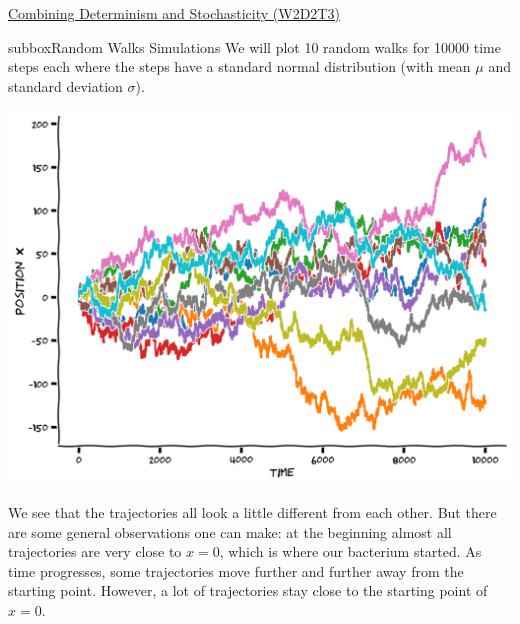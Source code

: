 \begin{textbox}{\href{https://compneuro.neuromatch.io/tutorials/W2D2_LinearSystems/student/W2D2_Tutorial3.html}{Combining Determinism and Stochasticity (W2D2T3)} }

\begin{subbox}{subbox}{Random Walks Simulations}
\scriptsize
We will plot 10 random walks for 10000 time steps each where the steps have a standard normal distribution (with mean $\mu$ and standard deviation $\sigma$). 


\begin{center}
\includegraphics[scale=0.25]{Figures/LS/CDS_Figure3.png}
\end{center}

We see that the trajectories all look a little different from each other. But there are some general observations one can make: at the beginning almost all trajectories are very close to $x=0$, which is where our bacterium started. As time progresses, some trajectories move further and further away from the starting point. However, a lot of trajectories stay close to the starting point of $x=0$. 


\end{subbox}
\end{textbox}
